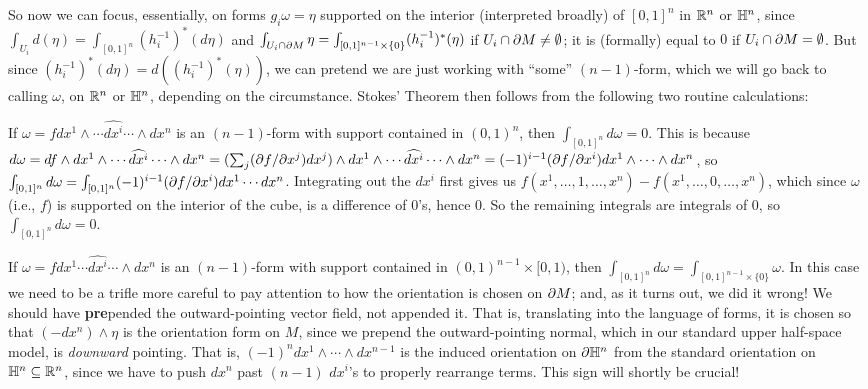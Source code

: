 So now we can focus, essentially, on forms $g_i\omega =\eta$ supported on the interior 
(interpreted broadly) of $[0,1]^n$ in ${\Bbb R}^n$ or ${\Bbb H}^n$, since 
$\int_{U_i} d(\eta)= \int_{[0,1]^n} (h_i^{-1})^*(d\eta)$ and 
$\int_{U_i\cap\partial M} \eta=\int_{[0,1]^{n-1}\times\{0\}} (h_i^{-1})^*(\eta)$
if $U_i\cap\partial M\neq \emptyset$; it is (formally) equal to $0$ if $U_i\cap\partial M=\emptyset$.
But since $(h_i^{-1})^*(d\eta)=d((h_i^{-1})^*(\eta))$, we can pretend we are just working with 
``some'' $(n-1)$-form, which we will go back to calling $\omega$, on ${\Bbb R}^n$ or ${\Bbb H}^n$, depending on the circumstance. 
Stokes' Theorem then follows from the following two routine calculations:

\msk

If $\omega = f dx^1\wedge\cdots\widehat{dx^i}\cdots\wedge dx^n$ is an $(n-1)$-form with support 
contained in $(0,1)^n$, then $\int_{[0,1]^n} d\omega = 0$. This is because
$d\omega = df\wedge dx^1\wedge\cdots\widehat{dx^i}\cdots\wedge dx^n=
(\sum_j(\partial f/\partial x^j)dx^j)\wedge dx^1\wedge\cdots\widehat{dx^i}\cdots\wedge dx^n
=(-1)^{i-1}(\partial f/\partial x^i) dx^1\wedge\cdots\wedge dx^n$, so 
$\int_{[0,1]^n} d\omega = \int_{[0,1]^n} (-1)^{i-1}(\partial f/\partial x^i) dx^1\cdots dx^n$.
Integrating out the $dx^i$ first gives us $f(x^1,\ldots,1,\ldots,x^n)-f(x^1,\ldots,0,\ldots,x^n)$,
which since $\omega$ (i.e., $f$) is supported on the interior of the cube, is a difference of
$0$'s, hence $0$. So the remaining integrals are integrals of $0$, so 
$\int_{[0,1]^n} d\omega = 0$.

\ssk

If $\omega = f dx^1\cdots\widehat{dx^i}\cdots\wedge dx^n$ is an $(n-1)$-form with support 
contained in $(0,1)^{n-1}\times [0,1)$, then $\int_{[0,1]^n} d\omega = \int_{[0,1]^{n-1}\times\{0\}}\omega$.
In this case we need to be a trifle more careful to pay attention to how the orientation is chosen
on $\partial M$; and, as it turns out, we did it wrong! We should have {\bf pre}pended the outward-pointing
vector field, not appended it. That is, translating into the language of forms, it is chosen so that
$(-dx^n)\wedge\eta$ is the orientation
form on $M$, since we prepend the outward-pointing normal, which in our standard upper half-space
model, is {\it downward} pointing. That is, $(-1)^{n}dx^1\wedge\cdots\wedge dx^{n-1}$ is the induced
orientation on $\partial{\Bbb H}^n$ from the standard orientation on ${\Bbb H}^n\subseteq{\Bbb R}^n$, since we have to
push $dx^n$ past $(n-1)$ $dx^i$'s to properly rearrange terms. This sign will shortly be crucial!


